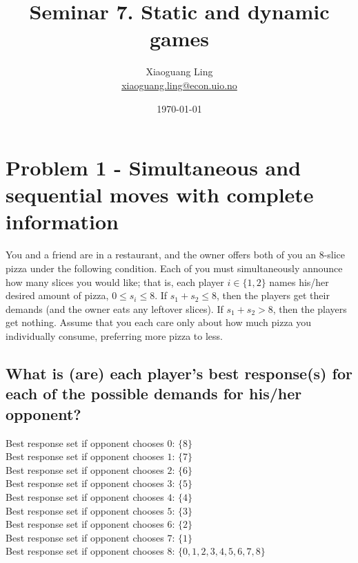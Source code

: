 \documentclass{article}
\title{Seminar 7. Static and dynamic games}
\author{Xiaoguang Ling \\  \href{xiaoguang.ling@econ.uio.no}{xiaoguang.ling@econ.uio.no}}
\date{\today}
\begin{document}
\maketitle



\section{Problem 1 - Simultaneous and sequential moves with complete information}


You and a friend are in a restaurant, and the owner offers both of you an 8-slice pizza under
the following condition. Each of you must simultaneously announce how many slices you would
like; that is, each player $i \in \{1, 2\}$ names his/her desired amount of pizza, $0 \leq s_i
\leq 8$. If $s_1 + s_2 \leq 8$, then the players get their demands (and the owner eats any
leftover slices). If $s_1 + s_2 > 8$, then the players get nothing. Assume that you each care
only about how much pizza you individually consume, preferring more pizza to less.


\subsection{What is (are) each player's best response(s) for each of the possible demands for his/her
opponent?}


Best response set if opponent chooses $0$: $\{8\}$ \\
Best response set if opponent chooses $1$: $\{7\}$ \\
Best response set if opponent chooses $2$: $\{6\}$ \\
Best response set if opponent chooses $3$: $\{5\}$ \\
Best response set if opponent chooses $4$: $\{4\}$ \\
Best response set if opponent chooses $5$: $\{3\}$ \\
Best response set if opponent chooses $6$: $\{2\}$ \\
Best response set if opponent chooses $7$: $\{1\}$ \\
Best response set if opponent chooses $8$: $\{0,1,2,3,4,5,6,7,8\}$
\end{document}
